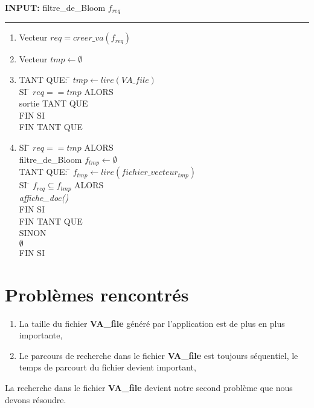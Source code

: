 \documentclass[a4paper,12pt]{report}
\begin{document}
\begin{flushleft}
	\begin{framed}
		\textbf{INPUT:} filtre\_de\_Bloom $f_{req}$
		\noindent\rule{\linewidth}{0.5pt}
		\begin{enumerate}
			\item Vecteur $req = creer\_va(f_{req}) $
			\item Vecteur $tmp \leftarrow \emptyset$
			\item
			\begin{tabbing}
				TANT QUE: \= $tmp \leftarrow lire(VA\_file)$\\
					\> SI \= $req == tmp$ ALORS\\
					\> \> sortie TANT QUE\\
					\> FIN SI\\
				FIN TANT QUE
			\end{tabbing}
			\item 
			\begin{tabbing}
				SI \= $req == tmp$ ALORS\\
				\> filtre\_de\_Bloom $f_{tmp} \leftarrow \emptyset $\\
				\> TANT QUE: \= $f_{tmp} \leftarrow lire(fichier\_vecteur_{tmp})$\\
				\> \> SI \= $f_{req} \subseteq f_{tmp}$ ALORS\\
				\> \> \> \textit{affiche\_doc()} \\
				\> \> FIN SI\\
				\> FIN TANT QUE\\
				SINON\\
				\> $\emptyset$\\
				FIN SI
			\end{tabbing}
		\end{enumerate}	
	\end{framed}
\end{flushleft}

\section{Problèmes rencontrés}
\begin{enumerate}
	\item La taille du fichier \textbf{VA\_file} généré par l'application est de plus en plus importante,
	\item Le parcours de recherche dans le fichier \textbf{VA\_file} est toujours séquentiel, le temps de parcourt du fichier devient important,
\end{enumerate}
	La recherche dans le fichier \textbf{VA\_file} devient notre second problème que nous devons résoudre.
\end{document}
